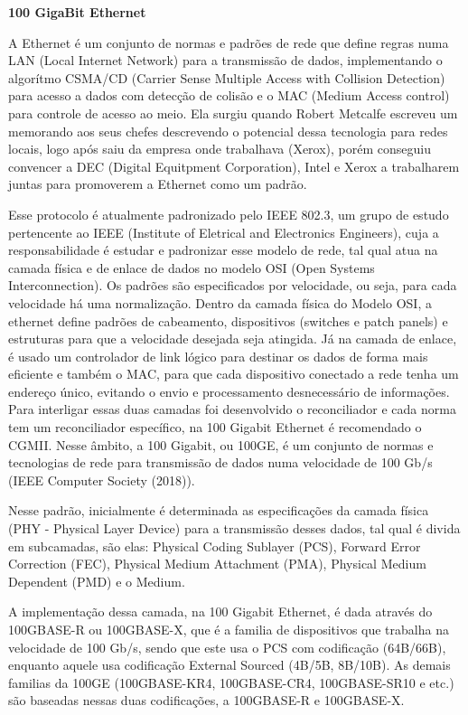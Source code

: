 \documentclass[a4paper,12pt]{article}
\begin{document}
\begin{center}
\textbf{{\LARGE 100 GigaBit Ethernet}} \\ \vspace{0.5cm}
\end{center}

A Ethernet é um conjunto de normas e padrões de rede que define regras numa LAN (Local Internet Network) para a transmissão de dados, implementando o algorítmo CSMA/CD (Carrier Sense Multiple Access with Collision Detection) para acesso a dados com detecção de colisão e o MAC (Medium Access control) para controle de acesso ao meio. Ela surgiu quando Robert Metcalfe escreveu um memorando aos seus chefes descrevendo o potencial dessa tecnologia para redes locais, logo após saiu da empresa onde trabalhava (Xerox), porém conseguiu convencer a DEC (Digital Equitpment Corporation), Intel e Xerox a trabalharem juntas para promoverem a Ethernet como um padrão.

Esse protocolo é atualmente padronizado pelo IEEE 802.3, um grupo de estudo pertencente ao IEEE (Institute of Eletrical and Electronics Engineers), cuja a responsabilidade é estudar e padronizar esse modelo de rede, tal qual atua na camada física e de enlace de dados no modelo OSI (Open Systems Interconnection). Os padrões são especificados por velocidade, ou seja, para cada velocidade há uma normalização.
Dentro da camada física do Modelo OSI, a ethernet define padrões de cabeamento, dispositivos (switches e patch panels) e estruturas para que a velocidade desejada seja atingida.
Já na camada de enlace, é usado um controlador de link lógico para destinar os dados de forma mais eficiente e também o MAC, para que cada dispositivo conectado a rede tenha um endereço único, evitando o envio e processamento desnecessário de informações.
Para interligar essas duas camadas foi desenvolvido o reconciliador e cada norma tem um reconciliador específico, na 100 Gigabit Ethernet é recomendado o CGMII.
Nesse âmbito, a 100 Gigabit, ou 100GE, é um conjunto de normas e tecnologias de rede para transmissão de dados numa velocidade de 100 Gb/s (IEEE Computer Society (2018)).


Nesse padrão, inicialmente é determinada as especificações da camada física (PHY - Physical Layer Device) para a transmissão desses dados, tal qual é divida em subcamadas, são elas: Physical Coding Sublayer (PCS), Forward Error Correction (FEC), Physical Medium Attachment (PMA), Physical Medium Dependent (PMD) e o Medium.

A implementação dessa camada, na 100 Gigabit Ethernet, é dada através do 100GBASE-R ou 100GBASE-X, que é a familia de dispositivos que trabalha na velocidade de 100 Gb/s, sendo que este usa o PCS com codificação (64B/66B), enquanto aquele usa codificação External Sourced (4B/5B, 8B/10B). As demais familias da 100GE (100GBASE-KR4, 100GBASE-CR4, 100GBASE-SR10 e etc.) são baseadas nessas duas codificações, a 100GBASE-R e 100GBASE-X.
\end{document}
